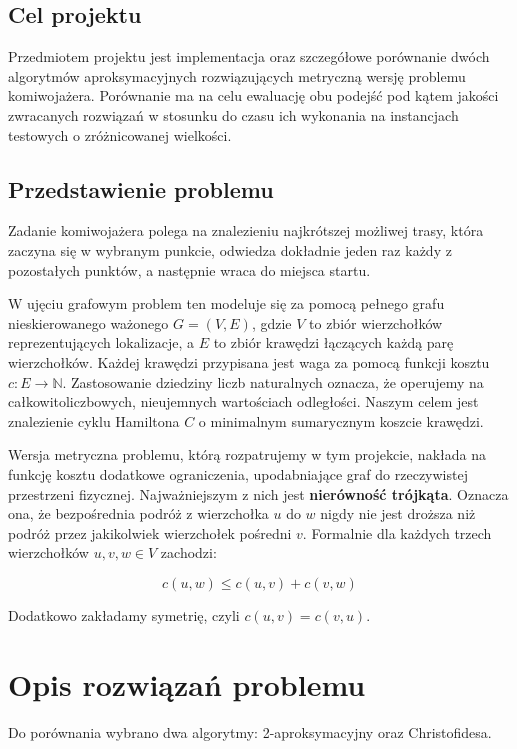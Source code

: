 \documentclass{article}
\theoremstyle{definition}
\theoremstyle{plain}
\theoremstyle{remark}
\begin{document}
\subsection{Cel projektu}

Przedmiotem projektu jest implementacja oraz szczegółowe porównanie dwóch algorytmów aproksymacyjnych rozwiązujących metryczną wersję problemu komiwojażera. Porównanie ma na celu ewaluację obu podejść pod kątem jakości zwracanych rozwiązań w stosunku do czasu ich wykonania na instancjach testowych o zróżnicowanej wielkości.

\subsection{Przedstawienie problemu}

Zadanie komiwojażera polega na znalezieniu najkrótszej możliwej trasy, która zaczyna się w wybranym punkcie, odwiedza dokładnie jeden raz każdy z pozostałych punktów, a następnie wraca do miejsca startu.

W ujęciu grafowym problem ten modeluje się za pomocą pełnego grafu nieskierowanego ważonego $G = (V, E)$, gdzie $V$ to zbiór wierzchołków reprezentujących lokalizacje, a $E$ to zbiór krawędzi łączących każdą parę wierzchołków. Każdej krawędzi przypisana jest waga za pomocą funkcji kosztu $c: E \to \mathbb{N}$. Zastosowanie dziedziny liczb naturalnych oznacza, że operujemy na całkowitoliczbowych, nieujemnych wartościach odległości. Naszym celem jest znalezienie cyklu Hamiltona $C$ o minimalnym sumarycznym koszcie krawędzi.

Wersja metryczna problemu, którą rozpatrujemy w tym projekcie, nakłada na funkcję kosztu dodatkowe ograniczenia, upodabniające graf do rzeczywistej przestrzeni fizycznej. Najważniejszym z nich jest \textbf{nierówność trójkąta}. Oznacza ona, że bezpośrednia podróż z wierzchołka $u$ do $w$ nigdy nie jest droższa niż podróż przez jakikolwiek wierzchołek pośredni $v$. Formalnie dla każdych trzech wierzchołków $u, v, w \in V$ zachodzi:

$$c(u, w) \le c(u, v) + c(v, w)$$

\noindent
Dodatkowo zakładamy symetrię, czyli $c(u, v) = c(v, u)$.

\newpage
	\section{Opis rozwiązań problemu}
	Do porównania wybrano dwa algorytmy: 2-aproksymacyjny\cite{cormen2012} oraz Christofidesa\cite{Christofides2022}.
\end{document}

